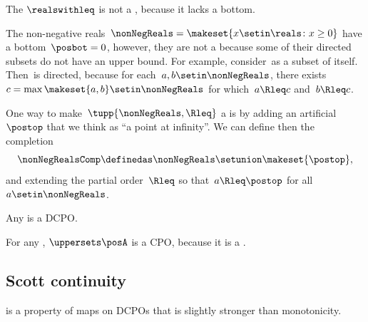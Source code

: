 \begin{example}
    \label{exa:Rcomp}
    The  $\realswithleq$ is not a \CPO, because it lacks a bottom.

    The non-negative reals~$\nonNegReals=\makeset{x\setin\reals \colon x\geq0}$ have a bottom~$\posbot=0$, however, they are not a \DCPO because some of their directed subsets do not have an upper bound.
    For example, consider~\nonNegReals as a subset of itself.
    Then~\nonNegReals is directed, because for each~$a,b\setin\nonNegReals$, there exists~$c=\max\makeset{a,b}\setin\nonNegReals$ for which~$a\Rleq c$ and~$b\Rleq c$.

    One way to make~$\tupp{ \nonNegReals,{{\Rleq}}} $ a \CPO is by adding an artificial ~$\postop$ that we think as ``a point at infinity''.
    We can define then the completion
    \begin{equation}
        \nonNegRealsComp\definedas\nonNegReals\setunion\makeset{\postop},
    \end{equation} and extending the partial order~$\Rleq$ so that~$a\Rleq\postop$ for all~$a\setin\nonNegReals$.
\end{example}

\begin{example}
    Any  is a DCPO.
\end{example}
\begin{example}
    For any  \posA, $\uppersets \posA$ is a CPO, because it is a .
\end{example}

\subsection{Scott continuity}

 is a property of maps on DCPOs that is slightly stronger than monotonicity.

